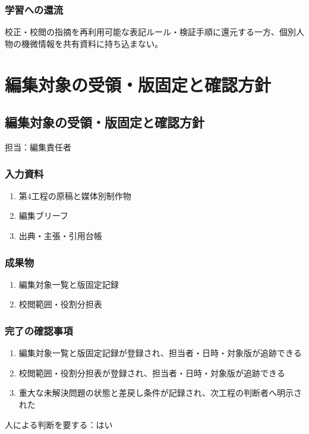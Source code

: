 \documentclass[a4paper,11pt]{article}
\begin{document}
\subsubsection{学習への還流}
\par 校正・校閲の指摘を再利用可能な表記ルール・検証手順に還元する一方、個別人物の機微情報を共有資料に持ち込まない。\par\medskip
\section{編集対象の受領・版固定と確認方針}
\subsection{編集対象の受領・版固定と確認方針}
\par 担当：編集責任者\par\medskip
\subsubsection*{入力資料}
\begin{enumerate}[leftmargin=2em,itemsep=0.35em]
\item 第4工程の原稿と媒体別制作物
\item 編集ブリーフ
\item 出典・主張・引用台帳
\end{enumerate}
\subsubsection*{成果物}
\begin{enumerate}[leftmargin=2em,itemsep=0.35em]
\item 編集対象一覧と版固定記録
\item 校閲範囲・役割分担表
\end{enumerate}
\subsubsection*{完了の確認事項}
\begin{enumerate}[leftmargin=2em,itemsep=0.35em]
\item 編集対象一覧と版固定記録が登録され、担当者・日時・対象版が追跡できる
\item 校閲範囲・役割分担表が登録され、担当者・日時・対象版が追跡できる
\item 重大な未解決問題の状態と差戻し条件が記録され、次工程の判断者へ明示された
\end{enumerate}
\par 人による判断を要する：はい\par\medskip
\end{document}
